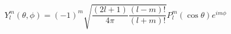 \documentclass[border=2pt,varwidth]{standalone}
\begin{document}
\[
  Y_l^m(\theta,\phi) =
  (-1)^m \sqrt{\frac{(2l+1)}{4 \pi} \frac{(l-m)!}{(l+m)!}}
  P_l^m(\cos \theta)
  e^{i m \phi}
\]
\end{document}
